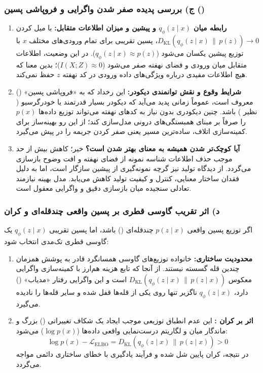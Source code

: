 \subsubsection{ج) بررسی پدیده صفر شدن واگرایی  و فروپاشی پسین ()}
\begin{enumerate}
  \item \textbf{رابطه میان $q_\phi(z \mid x)$ و پیشین و میزان اطلاعات متقابل:} با میل کردن $D_{\text{KL}}(q_\phi(z \mid x) \,\|\, p(z)) \to 0$، پسین تقریبی برای تمام ورودی‌های مختلف $x$ با توزیع پیشین یکسان می‌شود ($q_\phi(z \mid x) \approx p(z)$). در این وضعیت، اطلاعات متقابل میان ورودی و فضای نهفته صفر می‌شود ($I(X; Z) \approx 0$)؛ بدین معنا که  هیچ اطلاعات مفیدی درباره ویژگی‌های داده ورودی در کد نهفته $z$ حفظ نمی‌کند.
  \item \textbf{شرایط وقوع و نقش توانمندی دیکودر:} این رخداد که به «فروپاشی پسین» () معروف است، عموماً زمانی پدید می‌آید که دیکودر بسیار قدرتمند یا خودرگرسیو ( نظیر ) باشد. چنین دیکودری بدون نیاز به کدهای نهفته می‌تواند توزیع داده‌ها $p(x)$ را صرفاً بر مبنای همبستگی‌های درونی مدل‌سازی کند؛ از این رو بهینه‌ساز برای کمینه‌سازی اتلاف، ساده‌ترین مسیر یعنی صفر کردن جریمه  را در پیش می‌گیرد.
  \item \textbf{آیا کوچک‌تر شدن  همیشه به معنای بهتر شدن  است؟} خیر؛ کاهش بیش از حد  موجب حذف اطلاعات شناسه نمونه از فضای نهفته و افت وضوح بازسازی می‌گردد. از دیدگاه تولید نیز گرچه نمونه‌گیری از پیشین سازگار است، اما به دلیل فقدان ساختار معنایی، کنترل و کیفیت تولید کاهش می‌یابد. مدل بهینه نیازمند تعادلی سنجیده میان بازسازی دقیق و واگرایی  معقول است.
\end{enumerate}

\subsubsection{د) اثر تقریب گاوسی قطری بر پسین واقعی چندقله‌ای و کران }
اگر توزیع پسین واقعی $p(z \mid x)$ چندقله‌ای () باشد، اما پسین تقریبی $q_\phi(z \mid x)$ یک گاوسی قطری تک‌مدی انتخاب شود:
\begin{enumerate}
  \item \textbf{محدودیت ساختاری:} خانواده توزیع‌های گاوسی همسانگرد قادر به پوشش همزمان چندین قله گسسته نیستند. از آنجا که تابع هزینه  هم‌ارز با کمینه‌سازی واگرایی معکوس $D_{\text{KL}}(q_\phi(z \mid x) \,\|\, p(z \mid x))$ است و این واگرایی رفتار «مد‌یاب» () دارد، $q_\phi(z \mid x)$ ناگزیر تنها روی یکی از قله‌ها قفل شده و سایر قله‌ها را نادیده می‌گیرد.
  \item \textbf{اثر بر کران :} این عدم انطباق توزیعی موجب ایجاد یک شکاف تغییراتی () بزرگ و ماندگار میان  و لگاریتم درست‌نمایی واقعی داده‌ها ($\log p(x)$) می‌شود:
  \begin{equation}
    \log p(x) - \mathcal{L}_{\text{ELBO}} = D_{\text{KL}}(q_\phi(z \mid x) \,\|\, p(z \mid x)) > 0
  \end{equation}
  در نتیجه، کران پایین شل شده و فرآیند یادگیری با خطای ساختاری دائمی مواجه می‌گردد.
\end{enumerate}

